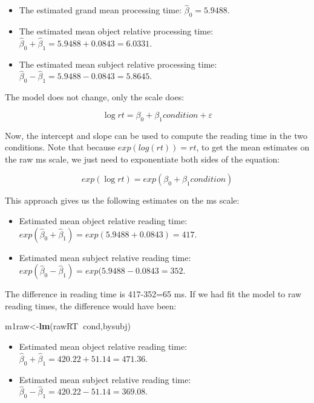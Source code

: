 \documentclass[12pt,]{krantz}
\newenvironment{Shaded}{\begin{snugshade}}{\end{snugshade}}
\newcommand{\KeywordTok}[1]{\textcolor[rgb]{0.13,0.29,0.53}{\textbf{#1}}}
\newcommand{\NormalTok}[1]{#1}
\newcommand{\OperatorTok}[1]{\textcolor[rgb]{0.81,0.36,0.00}{\textbf{#1}}}
\providecommand{\tightlist}{%
  \setlength{\itemsep}{0pt}\setlength{\parskip}{0pt}}
\begin{document}
\begin{itemize}
\tightlist
\item
  The estimated grand mean processing time: \(\hat\beta_0=5.9488\).
\item
  The estimated mean object relative processing time: \(\hat\beta_0+\hat\beta_1=5.9488+0.0843=6.0331\).
\item
  The estimated mean subject relative processing time: \(\hat\beta_0-\hat\beta_1=5.9488-0.0843=5.8645\).
\end{itemize}

The model does not change, only the scale does:

\begin{equation}
\log rt = \beta_0 + \beta_1 condition  + \varepsilon 
\end{equation}

Now, the intercept and slope can be used to compute the reading time in the two conditions.
Note that because \(exp(log(rt))=rt\), to get the mean estimates on the raw ms scale, we just need to exponentiate both sides of the equation:

\begin{equation}
exp(\log rt) = exp( \beta_0 + \beta_1 condition)
\end{equation}

This approach gives us the following estimates on the ms scale:

\begin{itemize}
\tightlist
\item
  Estimated mean object relative reading time: \(exp(\hat\beta_0+\hat\beta_1)=exp(5.9488+0.0843)=417\).
\item
  Estimated mean subject relative reading time: \(exp(\hat\beta_0-\hat\beta_1)=exp(5.9488-0.0843=352\).
\end{itemize}

The difference in reading time is 417-352=65 ms. If we had fit the model to raw reading times, the difference would have been:

\begin{Shaded}
\begin{Highlighting}[]
\NormalTok{m1raw<-}\KeywordTok{lm}\NormalTok{(rawRT}\OperatorTok{~}\NormalTok{cond,bysubj)}
\end{Highlighting}
\end{Shaded}

\begin{itemize}
\tightlist
\item
  Estimated mean object relative reading time: \(\hat\beta_0+\hat\beta_1=420.22+51.14=471.36\).
\item
  Estimated mean subject relative reading time: \(\hat\beta_0-\hat\beta_1=420.22-51.14=369.08\).
\end{itemize}
\end{document}
